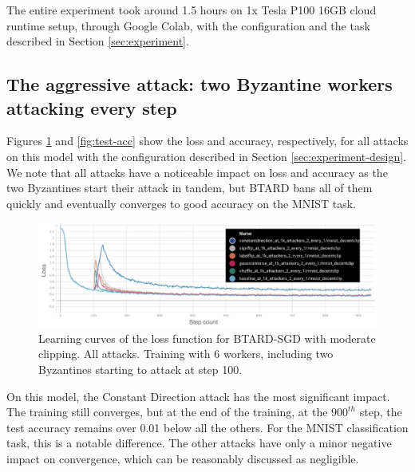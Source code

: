 \documentclass{article}
\begin{document}
The entire experiment took around 1.5 hours on 1x Tesla P100 16GB cloud runtime setup, through Google Colab, with the configuration and the task described in Section \ref{sec:experiment}.

\subsection{The aggressive attack: two Byzantine workers attacking every step}

Figures \ref{fig:learning-curve} and \ref{fig:test-acc} show the loss and accuracy, respectively, for all attacks on this model with the configuration described in Section \ref{sec:experiment-design}. We note that all attacks have a noticeable impact on loss and accuracy as the two Byzantines start their attack in tandem, but BTARD bans all of them quickly and eventually converges to good accuracy on the MNIST task.

\begin{figure}[h!]
\centering
\includegraphics[width=\textwidth]{figs/aggressive_attack_loss.jpg}
\caption{Learning curves of the loss function for BTARD-SGD with moderate clipping. All attacks. Training with 6 workers, including two Byzantines starting to attack at step 100.}
\label{fig:learning-curve}
\end{figure}

On this model, the Constant Direction attack has the most significant impact. The training still converges, but at the end of the training, at the $900^{th}$ step, the test accuracy remains over 0.01 below all the others. For the MNIST classification task, this is a notable difference. The other attacks have only a minor negative impact on convergence, which can be reasonably discussed as negligible.
\end{document}
